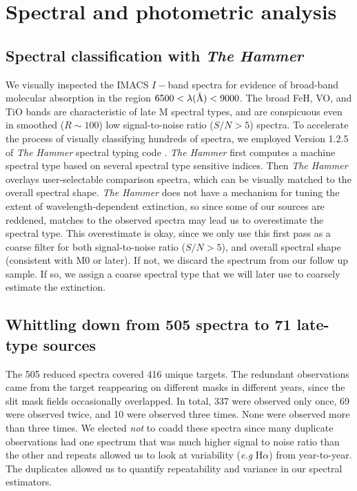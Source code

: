 \section{Spectral and photometric analysis}

\subsection{Spectral classification with \emph{The Hammer}}
We visually inspected the IMACS $I-$band spectra for evidence of broad-band molecular absorption in the region $6500<\lambda(\mbox{\normalfont\AA})<9000 $.  The broad FeH, VO, and TiO bands are characteristic of late M spectral types, and are conspicuous even in smoothed ($R\sim100$) low signal-to-noise ratio ($S/N > 5$) spectra.  To accelerate the process of visually classifying hundreds of spectra, we employed Version 1.2.5 of \emph{The Hammer} spectral typing code \citep{2007AJ....134.2398C,2011AJ....141...97W}.  \emph{The Hammer} first computes a machine spectral type based on several spectral type sensitive indices.  Then \emph{The Hammer} overlays user-selectable comparison spectra, which can be visually matched to the overall spectral shape.  \emph{The Hammer} does not have a mechanism for tuning the extent of wavelength-dependent extinction, so since some of our sources are reddened, matches to the observed spectra may lead us to overestimate the spectral type.  This overestimate is okay, since we only use this first pass as a coarse filter for both signal-to-noise ratio ($S/N >5$), and overall spectral shape (consistent with M0 or later).  If not, we discard the spectrum from our follow up sample.  If so, we assign a coarse spectral type that we will later use to coarsely estimate the extinction.

\subsection{ Whittling down from 505 spectra to 71 late-type sources}
The 505 reduced spectra covered 416 unique targets.  The redundant observations came from the target reappearing on different masks in different years, since the slit mask fields occasionally overlapped.  In total, 337 were observed only once, 69 were observed twice, and 10 were observed three times.  None were observed more than three times.  We elected \emph{not} to coadd these spectra since many duplicate observations had one spectrum that was much higher signal to noise ratio than the other and repeats allowed us to look at variability (\emph{e.g} H$\alpha$) from year-to-year.  The duplicates allowed us to quantify repeatability and variance in our spectral estimators.  

